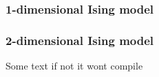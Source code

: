\subsubsection{1-dimensional Ising model}
\subsubsection{2-dimensional Ising model}
Some text if not it wont compile